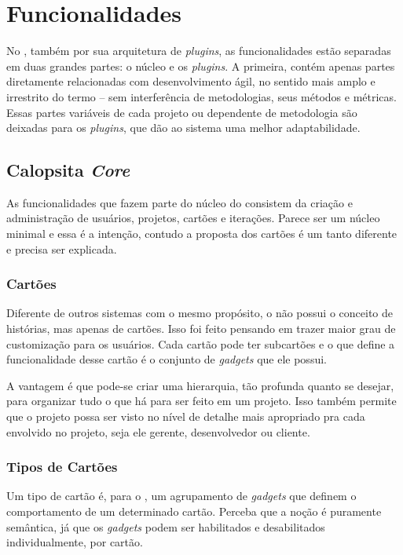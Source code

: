 \section{Funcionalidades}

No \calopsita{}, também por sua arquitetura de \textit{plugins}, as funcionalidades estão separadas em duas grandes partes: o núcleo e os \textit{plugins}. A primeira, contém apenas partes diretamente relacionadas com desenvolvimento ágil, no sentido mais amplo e irrestrito do termo -- sem interferência de metodologias, seus métodos e métricas. Essas partes variáveis de cada projeto ou dependente de metodologia são deixadas para os \textit{plugins}, que dão ao sistema uma melhor adaptabilidade.

\subsection{Calopsita \textit{Core}}

As funcionalidades que fazem parte do núcleo do \calopsita{} consistem da criação e administração de usuários, projetos, cartões e iterações. Parece ser um núcleo minimal e essa é a intenção, contudo a proposta dos cartões é um tanto diferente e precisa ser explicada.

\subsubsection*{Cartões}

Diferente de outros sistemas com o mesmo propósito, o \calopsita{} não possui o conceito de histórias, mas apenas de cartões. Isso foi feito pensando em trazer maior grau de customização para os usuários. Cada cartão pode ter subcartões e o que define a funcionalidade desse cartão é o conjunto de \textit{gadgets} que ele possui. 

A vantagem é que pode-se criar uma hierarquia, tão profunda quanto se desejar, para organizar tudo o que há para ser feito em um projeto. Isso também permite que o projeto possa ser visto no nível de detalhe mais apropriado pra cada envolvido no projeto, seja ele gerente, desenvolvedor ou cliente. 

\subsubsection*{Tipos de Cartões}

Um tipo de cartão é, para o \calopsita{}, um agrupamento de \textit{gadgets} que definem o comportamento de um determinado cartão. Perceba que a noção é puramente semântica, já que os \textit{gadgets} podem ser habilitados e desabilitados individualmente, por cartão.


